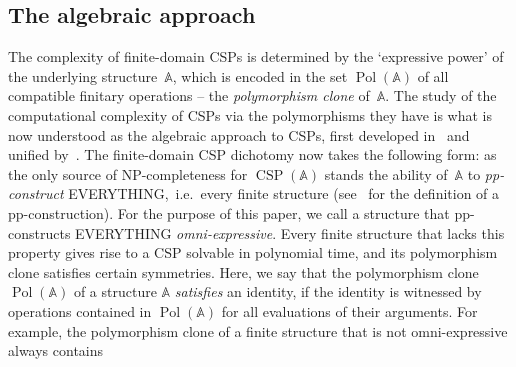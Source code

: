 \documentclass[a4paper,reqno, cleveref]{amsart}
\DeclareMathOperator{\CSP}{CSP}
\DeclareMathOperator{\Pol}{Pol}
\newcommand{\sA}{\mathbb A}
\begin{document}
 \subsection{The algebraic approach} 
The complexity of finite-domain CSPs is determined by the `expressive power'
of the underlying structure~$\sA$, which is encoded in the set $\Pol(\sA)$ of all compatible finitary operations -- the \emph{polymorphism clone} of~$\sA$. The study of the computational complexity of CSPs via the polymorphisms they have 
is what is now understood as the algebraic approach to CSPs, first developed in~\cite{Jeavons,JBK} and unified by~\cite{wonderland}. The finite-domain CSP dichotomy now takes the following form: as the only source of NP-completeness for $\CSP(\sA)$ stands the ability of~$\sA$ to \emph{pp-construct} EVERYTHING,~i.e.~every finite structure (see~ for the definition of a pp-construction). For the purpose of this paper, we call a structure that pp-constructs EVERYTHING \emph{omni-expressive}. 
Every finite structure that lacks this property gives rise to a CSP solvable in polynomial time, and its polymorphism clone satisfies certain symmetries.  Here, we say that the polymorphism clone $\Pol(\sA)$ of a structure $\sA$ \emph{satisfies} an identity, if the identity is witnessed by operations contained in $\Pol(\sA)$ for all evaluations of their arguments.
%
For example,  the polymorphism clone of a finite structure that is not omni-expressive always contains
\end{document}
